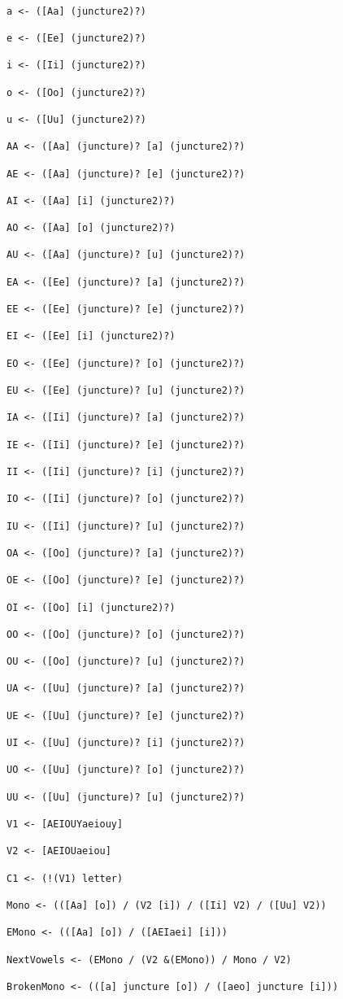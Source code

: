 \documentclass[12pt]{article}
\begin{document}
\begin{verbatim}

a <- ([Aa] (juncture2)?)

e <- ([Ee] (juncture2)?)

i <- ([Ii] (juncture2)?)

o <- ([Oo] (juncture2)?)

u <- ([Uu] (juncture2)?)

AA <- ([Aa] (juncture)? [a] (juncture2)?)

AE <- ([Aa] (juncture)? [e] (juncture2)?)

AI <- ([Aa] [i] (juncture2)?)

AO <- ([Aa] [o] (juncture2)?)

AU <- ([Aa] (juncture)? [u] (juncture2)?)

EA <- ([Ee] (juncture)? [a] (juncture2)?)

EE <- ([Ee] (juncture)? [e] (juncture2)?)

EI <- ([Ee] [i] (juncture2)?)

EO <- ([Ee] (juncture)? [o] (juncture2)?)

EU <- ([Ee] (juncture)? [u] (juncture2)?)

IA <- ([Ii] (juncture)? [a] (juncture2)?)

IE <- ([Ii] (juncture)? [e] (juncture2)?)

II <- ([Ii] (juncture)? [i] (juncture2)?)

IO <- ([Ii] (juncture)? [o] (juncture2)?)

IU <- ([Ii] (juncture)? [u] (juncture2)?)

OA <- ([Oo] (juncture)? [a] (juncture2)?)

OE <- ([Oo] (juncture)? [e] (juncture2)?)

OI <- ([Oo] [i] (juncture2)?)

OO <- ([Oo] (juncture)? [o] (juncture2)?)

OU <- ([Oo] (juncture)? [u] (juncture2)?)

UA <- ([Uu] (juncture)? [a] (juncture2)?)

UE <- ([Uu] (juncture)? [e] (juncture2)?)

UI <- ([Uu] (juncture)? [i] (juncture2)?)

UO <- ([Uu] (juncture)? [o] (juncture2)?)

UU <- ([Uu] (juncture)? [u] (juncture2)?)

V1 <- [AEIOUYaeiouy]

V2 <- [AEIOUaeiou]

C1 <- (!(V1) letter)

Mono <- (([Aa] [o]) / (V2 [i]) / ([Ii] V2) / ([Uu] V2))

EMono <- (([Aa] [o]) / ([AEIaei] [i]))

NextVowels <- (EMono / (V2 &(EMono)) / Mono / V2)

BrokenMono <- (([a] juncture [o]) / ([aeo] juncture [i]))

\end{verbatim}
\end{document}
